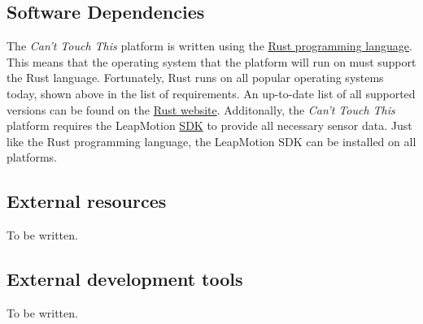 \documentclass[a4paper]{article}
\begin{document}
  \subsection{Software Dependencies}
  The \textit{Can't Touch This} platform is written using the
  \href{https://rust-lang.org}{Rust programming language}. This means that the
  operating system that the platform will run on must support the Rust language.
  Fortunately, Rust runs on all popular operating systems today, shown above in
  the list of requirements. An up-to-date list of all supported versions can be
  found on the
  \href{https://forge.rust-lang.org/platform-support.html}{Rust website}.
  Additonally, the \textit{Can't Touch This} platform requires the LeapMotion
  \href{https://developer.leapmotion.com/sdk/v2}{SDK} to provide all necessary
  sensor data. Just like the Rust programming language, the LeapMotion SDK can
  be installed on all platforms.

  \subsection{External resources}
  To be written.

  \subsection{External development tools}
  To be written.
  \clearpage






\end{document}
